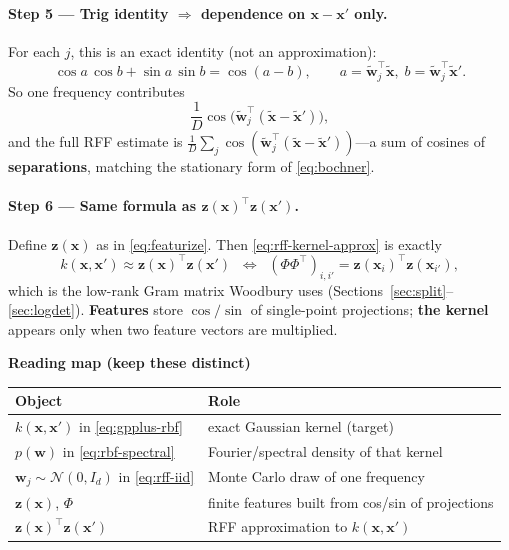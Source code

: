 \documentclass[11pt]{article}
\newcommand{\Ph}{\Phi}
\begin{document}
\paragraph{Step 5 --- Trig identity $\Rightarrow$ dependence on $\mathbf x-\mathbf x'$ only.}
For each $j$, this is an exact identity (not an approximation):
\begin{equation}
  \label{eq:cos-sin-id}
  \cos a\,\cos b + \sin a\,\sin b = \cos(a-b),
  \qquad
  a=\tilde{\mathbf w}_j^{\top}\tilde{\mathbf x},\;
  b=\tilde{\mathbf w}_j^{\top}\tilde{\mathbf x}'.
\end{equation}
So one frequency contributes
\[
  \frac{1}{D}\cos\!\bigl(\tilde{\mathbf w}_j^{\top}(\tilde{\mathbf x}-\tilde{\mathbf x}')\bigr),
\]
and the full RFF estimate is $\frac{1}{D}\sum_j \cos(\tilde{\mathbf w}_j^{\top}(\tilde{\mathbf x}-\tilde{\mathbf x}'))$---a sum of cosines of \textbf{separations}, matching the stationary form of \eqref{eq:bochner}.

\paragraph{Step 6 --- Same formula as $\mathbf z(\mathbf x)^{\top}\mathbf z(\mathbf x')$.}
Define $\mathbf z(\mathbf x)$ as in \eqref{eq:featurize}. Then \eqref{eq:rff-kernel-approx} is exactly
\begin{equation}
  \label{eq:rff-inner-product}
  \boxed{
  k(\mathbf x,\mathbf x') \approx \mathbf z(\mathbf x)^{\top}\mathbf z(\mathbf x')
  \;\;\Longleftrightarrow\;\;
  (\Ph\Ph^{\top})_{i,i'} = \mathbf z(\mathbf x_i)^{\top}\mathbf z(\mathbf x_{i'}),
  }
\end{equation}
which is the low-rank Gram matrix Woodbury uses (Sections~\ref{sec:split}--\ref{sec:logdet}).
\textbf{Features} store $\cos/\sin$ of single-point projections; \textbf{the kernel} appears only when two feature vectors are multiplied.

\begin{samebox}
\textbf{Reading map (keep these distinct)}
\begin{center}
\renewcommand{\arraystretch}{1.3}
\begin{tabular}{@{}p{}p{}@{}}
\toprule
\textbf{Object} & \textbf{Role} \\
\midrule
$k(\mathbf x,\mathbf x')$ in \eqref{eq:gpplus-rbf} & exact Gaussian kernel (target) \\
$p(\mathbf w)$ in \eqref{eq:rbf-spectral} & Fourier/spectral density of that kernel \\
$\mathbf w_j\sim\mathcal N(0,I_d)$ in \eqref{eq:rff-iid} & Monte Carlo draw of one frequency \\
$\mathbf z(\mathbf x)$, $\Ph$ & finite features built from cos/sin of projections \\
$\mathbf z(\mathbf x)^{\top}\mathbf z(\mathbf x')$ & RFF approximation to $k(\mathbf x,\mathbf x')$ \\
\bottomrule
\end{tabular}
\end{center}
\end{samebox}
\end{document}
